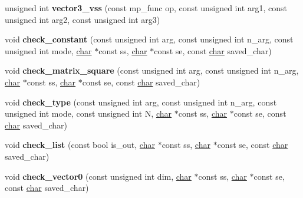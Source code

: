 \begin{DoxyCompactItemize}
\item 
\mbox{\label{structcimg__library__suffixed_1_1CImg_1_1__cimg__math__parser_a56491c4fefa5379b35ce87f4654c6001}} 
unsigned int {\bfseries vector3\+\_\+vss} (const mp\+\_\+func op, const unsigned int arg1, const unsigned int arg2, const unsigned int arg3)
\item 
\mbox{\label{structcimg__library__suffixed_1_1CImg_1_1__cimg__math__parser_ab95626fc3c9df8e9bb3d182328372379}} 
void {\bfseries check\+\_\+constant} (const unsigned int arg, const unsigned int n\+\_\+arg, const unsigned int mode, \hyperlink{classchar}{char} $\ast$const ss, \hyperlink{classchar}{char} $\ast$const se, const \hyperlink{classchar}{char} saved\+\_\+char)
\item 
\mbox{\label{structcimg__library__suffixed_1_1CImg_1_1__cimg__math__parser_a9eaf3a1d2c38a1a1b9275604320fc1cc}} 
void {\bfseries check\+\_\+matrix\+\_\+square} (const unsigned int arg, const unsigned int n\+\_\+arg, \hyperlink{classchar}{char} $\ast$const ss, \hyperlink{classchar}{char} $\ast$const se, const \hyperlink{classchar}{char} saved\+\_\+char)
\item 
\mbox{\label{structcimg__library__suffixed_1_1CImg_1_1__cimg__math__parser_ae5bd43fbdd9ff01b95538fd9958ea79f}} 
void {\bfseries check\+\_\+type} (const unsigned int arg, const unsigned int n\+\_\+arg, const unsigned int mode, const unsigned int N, \hyperlink{classchar}{char} $\ast$const ss, \hyperlink{classchar}{char} $\ast$const se, const \hyperlink{classchar}{char} saved\+\_\+char)
\item 
\mbox{\label{structcimg__library__suffixed_1_1CImg_1_1__cimg__math__parser_af19c9440058cbae77a2d7aafb576fb86}} 
void {\bfseries check\+\_\+list} (const bool is\+\_\+out, \hyperlink{classchar}{char} $\ast$const ss, \hyperlink{classchar}{char} $\ast$const se, const \hyperlink{classchar}{char} saved\+\_\+char)
\item 
\mbox{\label{structcimg__library__suffixed_1_1CImg_1_1__cimg__math__parser_adb9859b0bd33e7d69c94b50d407b7a9e}} 
void {\bfseries check\+\_\+vector0} (const unsigned int dim, \hyperlink{classchar}{char} $\ast$const ss, \hyperlink{classchar}{char} $\ast$const se, const \hyperlink{classchar}{char} saved\+\_\+char)
\end{DoxyCompactItemize}
